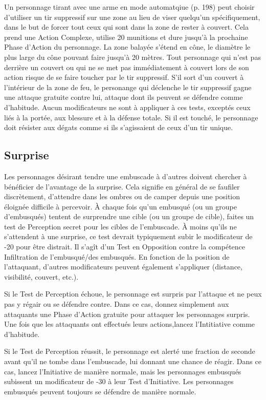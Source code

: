 Un personnage tirant avec une arme en mode automatqiue (p. 198) peut choisir d'utiliser un tir suppressif sur une zone au lieu de viser quelqu'un spécifiquement, dans le but de forcer tout ceux qui sont dans la zone de rester à couvert. Cela prend une Action Complexe, utilise 20 munitions et dure jusqu'à la prochaine Phase d'Action du personnage. La zone balayée s'étend en cône, le diamètre le plus large du cône pouvant faire jusqu'à 20 mètres. Tout personnage qui n'est pas derrière un couvert ou qui ne se met pas immédiatement à couvert lors de son action risque de se faire toucher par le tir suppressif. S'il sort d'un couvert à l'intérieur de la zone de feu, le personange qui déclenche le tir suppressif gagne une attaque gratuite contre lui, attaque dont ils peuvent se défendre comme d'habitude. Aucun modificateurs ne sont à appliquer à ces tests, exceptés ceux liés à la portée, aux blessure et à la défense totale. Si il est touché, le personnage doit résister aux dégats comme si ils s'agissaient de ceux d'un tir unique. 



\subsection{Surprise} \label{sec:surprise} 

Les personnages désirant tendre une embuscade à d'autres doivent chercher à bénéficier de l'avantage de la surprise. Cela signifie en général de se faufiler discrètement, d'attendre dans les ombres ou de camper depuis une position éloignée difficile à percevoir. À chaque fois qu'un embusqué (ou un groupe d'embusqués) tentent de surprendre une cible (ou un groupe de cible), faites un test de Perception secret pour les cibles de l'embuscade. À moins qu'ils ne s'attendent à une surprise, ce test devrait typiquement subir le modificateur de -20 pour être distrait. Il s'agît d'un Test en Opposition contre la compétence Infiltration de l'embusqué/des embusqués. En fonction de la position de l'attaquant, d'autres modificateurs peuvent également s'appliquer (distance, visibilité, couvert, etc.). 

Si le Test de Perception échoue, le personnage est surpris par l'attaque et ne peux pas y régair ou se défendre contre. Dans ce cas, donnez simplement aux attaquants une Phase d'Action gratuite pour attaquer les personnages surpris. Une fois que les attaquants ont effectués leurs actions,lancez l'Intitiative comme d'habitude. 

Si le Test de Perception réussit, le personnage est alerté une fraction de seconde avant qu'il ne tombe dans l'embuscade, lui donnant une chance de réagir. Dans ce cas, lancez l'Initiative de manière normale, mais les personnages embusqués subissent un modificateur de -30 à leur Test d'Initiative. Les personnages embusqués peuvent toujours se défendre de manière normale. 


